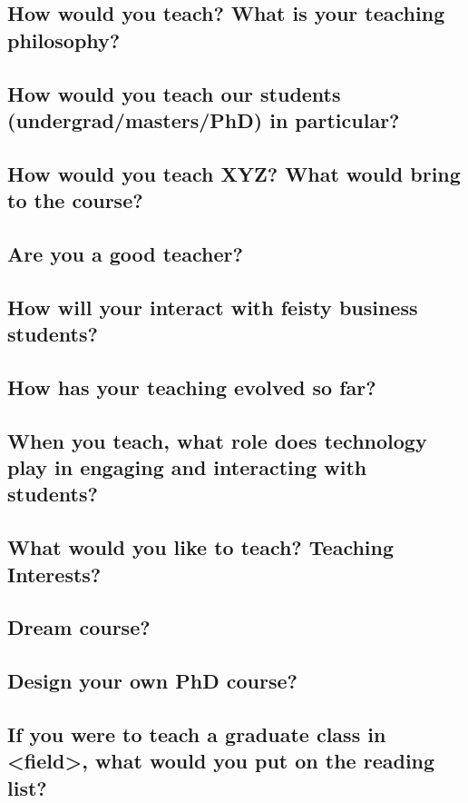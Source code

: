 \documentclass[12pt]{article}
\theoremstyle{plain}
\theoremstyle{plain}
\theoremstyle{plain}
\theoremstyle{plain}
\theoremstyle{plain}
\theoremstyle{plain}
\begin{document}
\subsection{How would you teach? What is your teaching philosophy?}
\label{sec:orgeb61f31}
\subsection{How would you teach our students (undergrad/masters/PhD) in particular?}
\label{sec:orge29071a}
\subsection{How would you teach XYZ? What would bring to the course?}
\label{sec:orgf1bd7c1}
\subsection{Are you a good teacher?}
\label{sec:org7018539}
\subsection{How will your interact with feisty business students?}
\label{sec:org69d6250}
\subsection{How has your teaching evolved so far?}
\label{sec:org18876c4}
\subsection{When you teach, what role does technology play in engaging and interacting with students?}
\label{sec:org2568a7c}
\subsection{What would you like to teach? Teaching Interests?}
\label{sec:orgc84b1ca}
\subsection{Dream course?}
\label{sec:org0fbdbec}
\subsection{Design your own PhD course?}
\label{sec:org063a48b}
\subsection{If you were to teach a graduate class in <field>, what would you put on the reading list?}
\label{sec:org8c25900}
\end{document}
